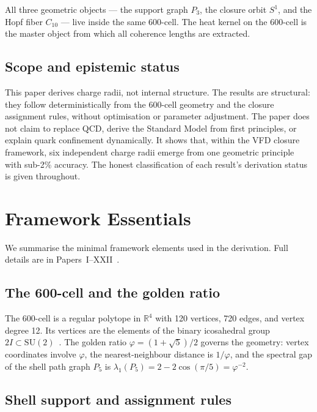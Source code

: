 \documentclass[12pt]{article}
\newcommand{\phig}{\varphi}
\begin{document}
All three geometric objects --- the support graph $P_3$, the closure orbit $S^1$, and the Hopf fiber $C_{10}$ --- live inside the same 600-cell. The heat kernel on the 600-cell is the master object from which all coherence lengths are extracted.

\subsection*{Scope and epistemic status}

This paper derives charge radii, not internal structure. The results are structural: they follow deterministically from the 600-cell geometry and the closure assignment rules, without optimisation or parameter adjustment. The paper does not claim to replace QCD, derive the Standard Model from first principles, or explain quark confinement dynamically. It shows that, within the VFD closure framework, six independent charge radii emerge from one geometric principle with sub-2\% accuracy. The honest classification of each result's derivation status is given throughout.

\section{Framework Essentials}\label{sec:framework}

We summarise the minimal framework elements used in the derivation. Full details are in Papers~I--XXII~\citep{SmartI, SmartIV, SmartVIII, SmartXXII}.

\subsection{The 600-cell and the golden ratio}

The 600-cell is a regular polytope in $\mathbb{R}^4$ with 120 vertices, 720 edges, and vertex degree 12. Its vertices are the elements of the binary icosahedral group $2I \subset \mathrm{SU}(2)$~\citep{Coxeter1973}. The golden ratio $\phig = (1+\sqrt{5})/2$ governs the geometry: vertex coordinates involve $\phig$, the nearest-neighbour distance is $1/\phig$, and the spectral gap of the shell path graph $P_5$ is $\lambda_1(P_5) = 2 - 2\cos(\pi/5) = \phig^{-2}$.

\subsection{Shell support and assignment rules}
\end{document}
